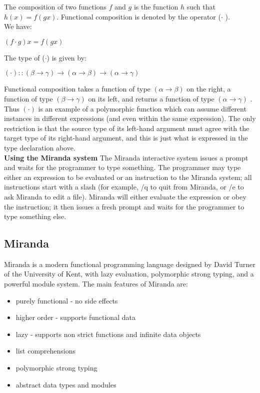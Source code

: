 \documentclass[11pt]{article}
\begin{document}
The composition of two functions $f$ and $g$ is the function $h$ such that $h (x) =
f (g x )$. 
Functional composition is denoted by the operator ($\cdot$ ).\\
We have:
\begin{center}
    

$(f \cdot g) x = f (g x)$

\end{center}
The type of ($\cdot$) is given by:

\begin{center}
    

$(\cdot) :: (\beta \rightarrow \gamma) \rightarrow (\alpha \rightarrow \beta) \rightarrow (\alpha \rightarrow \gamma)$

\end{center}

Functional composition takes a function of type $ (\alpha \rightarrow \beta) $ on the right, a
function of type $(\beta \rightarrow \gamma)$ on its left, and returns a function of type $(\alpha \rightarrow \gamma)$ .
Thus $(\cdot)$ is an example of a polymorphic function which can assume
different instances in different expressions (and even within the same expression). The only restriction is that the source type of its left-hand argument
must agree with the target type of its right-hand argument, and this is just
what is expressed in the type declaration above. \\

\textbf{Using the Miranda system} \newline
The Miranda interactive system issues a prompt and waits for the programmer to
type something. The programmer may type either an expression to be evaluated
or an instruction to the Miranda system; all instructions start with a slash (for
example, /q to quit from Miranda, or /e to ask Miranda to edit a file). Miranda
will either evaluate the expression or obey the instruction; it then issues a fresh
prompt and waits for the programmer to type something else.

\subsection{Miranda}

Miranda is a modern functional programming language designed by David Turner of the University of Kent, with lazy evaluation, polymorphic strong typing, and a powerful module system. The main features of Miranda are:
\begin{itemize}
    \item purely functional - no side effects
\item higher order - supports functional data
\item lazy - supports non strict functions and infinite data objects
\item list comprehensions
\item polymorphic strong typing
\item abstract data types and modules
\end{itemize}
\end{document}
